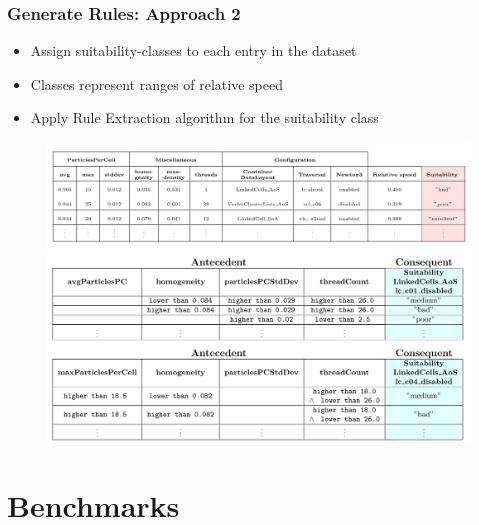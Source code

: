 \documentclass[
	10pt,
	t		%
]{beamer}
\begin{document}
\begin{frame}
	\frametitle{Generate Rules: Approach 2}

	\begin{itemize}
		\item Assign suitability-classes to each entry in the dataset
		\item Classes represent ranges of relative speed
		\item Apply Rule Extraction algorithm for the suitability class
	\end{itemize}

	\begin{figure}
		\centering
		\includegraphics[width=1\textwidth, trim={0 2.25cm 0 0},clip]{figures/aggregated-data-suitability.png}
		\vspace{1.5cm}
		\includegraphics[width=1\textwidth, trim={0 9cm 0 0.1cm},clip]{figures/final-rules-suitability.png}
	\end{figure}
\end{frame}

\section{Benchmarks}
\end{document}
